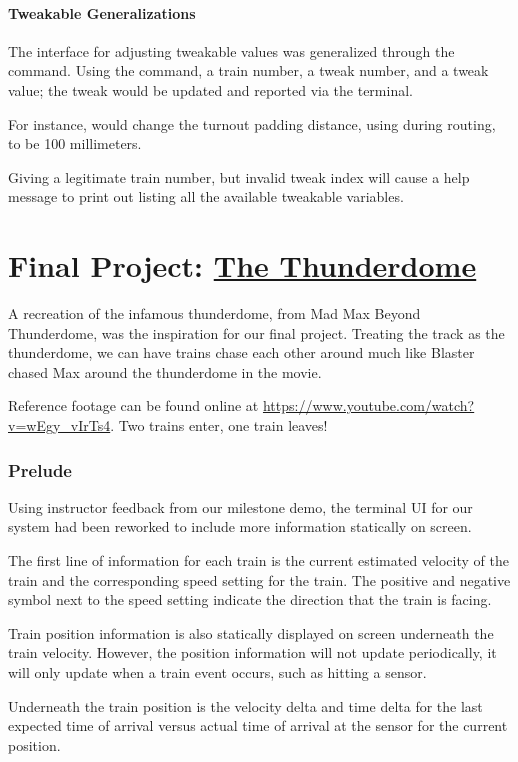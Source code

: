 \documentclass[pdftex,10pt,a4paper]{article}
\begin{document}
\subsection*{Tweakable Generalizations}

The interface for adjusting tweakable values was generalized through
the  command. Using the command, a train number, a tweak
number, and a tweak value; the tweak would be updated and reported
via the terminal.

For instance,  would change the turnout padding
distance, using during routing, to be 100 millimeters.

Giving a legitimate train number, but invalid tweak index will cause a
help message to print out listing all the available tweakable variables.

\part*{Final Project: \underline{The Thunderdome}}

A recreation of the infamous thunderdome, from Mad Max Beyond
Thunderdome, was the inspiration for our final project. Treating the
track as the thunderdome, we can have trains chase each other around
much like Blaster chased Max around the thunderdome in the movie.

Reference footage can be found online at
\url{https://www.youtube.com/watch?v=wEgy\_vIrTs4}. Two trains enter,
one train leaves!

\section*{Prelude}

Using instructor feedback from our milestone demo, the terminal UI for
our system had been reworked to include more information statically on
screen.

The first line of information for each train is the current estimated
velocity of the train and the corresponding speed setting for the train.
The positive and negative symbol next to the speed setting
indicate the direction that the train is facing.

Train position information is also statically displayed on screen
underneath the train velocity. However, the position information will
not update periodically, it will only update when a train event
occurs, such as hitting a sensor.

Underneath the train position is the velocity delta and time delta
for the last expected time of arrival versus actual time of arrival at
the sensor for the current position.
\end{document}
